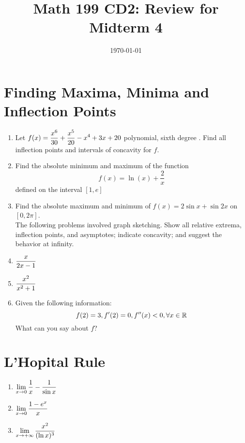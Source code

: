 




\title{Math 199 CD2: Review for Midterm 4}
\date{\today}



	
	\maketitle
	
	
	\section{Finding Maxima, Minima and Inflection Points}
	\begin{enumerate}
		\item Let $\displaystyle f(x)=\frac{x^6}{30}+\frac{x^5}{20}-x^4+3x+20$ polynomial, sixth degree . Find all inflection points and intervals of concavity for $f$.
		\vskip 5cm
	

		\item Find the absolute minimum and maximum of the function 
		$$f(x)=\ln(x) +\frac{2}{x}$$
		defined on the interval $[1,e]$
		\vskip 6cm

		\item Find the absolute maximum and minimum of $f(x) = 2\sin x + \sin2x$ on $[0,2\pi]$.\\
		\vskip 6cm
		The following problems involved graph sketching. Show all relative extrema, inflection points, and asymptotes; indicate concavity; and suggest the behavior at infinity.
		\item $\displaystyle \frac{x}{2x-1}$
		\vskip 4cm
		\item $\displaystyle \frac{x^2}{x^2+1}$
		\vskip 4cm
		\item Given the following information: 
		$$f(2) = 3, f'(2) = 0, f''(x)<0, \forall x \in \mathbb{R}$$
		What can you say about $f$?
		\vskip 4cm
	\end{enumerate}
	\section{L'Hopital Rule}
	\begin{enumerate}
		\item $\displaystyle \lim_{x \to 0}\frac{1}{x}-\frac{1}{\sin x}$
		\vskip 4cm
		\item $\displaystyle \lim_{x \to 0}\frac{1-e^x}{x}$
		\vskip 4cm
		\item $\displaystyle \lim_{x \to +\infty}\frac{x^2}{(\ln x)^3}$
		\vskip 4cm
	\end{enumerate}

